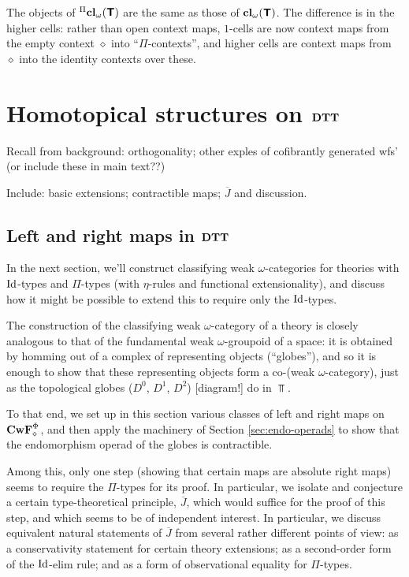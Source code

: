 \documentclass{amsart}
\newcommand{\Jbar}{\overline{J}}
\newcommand{\stuff}{{\Phi}}
\begin{document}
The objects of ${}^\Pi \mathbf{cl}_\omega (\textbf{\textsf{T}})$ are the same as those of $\mathbf{cl}_\omega(\textbf{\textsf{T}})$.  The difference is in the higher cells: rather than open context maps, $1$-cells are now context maps from the empty context $\diamond$ into ``$\Pi$-contexts'', and higher cells are context maps from $\diamond$ into the identity contexts over these.














\section{Homotopical structures on $\mathbf{DTT}$}

Recall from background: orthogonality; other exples of cofibrantly generated wfs' (or include these in main text??)

Include: basic extensions; contractible maps; $\Jbar$ and discussion.

\subsection{Left and right maps in $\mathbf{DTT}$}

\para In the next section, we'll construct classifying weak $\omega$-categories for theories with $\mathrm{Id}$-types and $\Pi$-types (with $\eta$-rules and functional extensionality), and discuss how it might be possible to extend this to require only the $\mathrm{Id}$-types.

The construction of the classifying weak $\omega$-category of a theory is closely analogous to that of the fundamental weak $\omega$-groupoid of a space: it is obtained by homming out of a complex of representing objects (``globes''), and so it is enough to show that these representing objects form a co-(weak $\omega$-category), just as the topological globes ($D^0$, $D^1$, $D^2$) [diagram!] do in $\Top$.

To that end, we set up in this section various classes of left and right maps on $\CwF^{\stuff}_\diamond$, and
then apply the machinery of Section \ref{sec:endo-operads} to show that the endomorphism operad of the globes is contractible.

Among this, only one step (showing that certain maps are absolute right maps) seems to require the $\Pi$-types for its proof.  In particular, we isolate and conjecture a certain type-theoretical principle, $\Jbar$, which would suffice for the proof of this step, and which seems to be of independent interest.  In particular, we discuss equivalent natural statements of $\Jbar$ from several rather different points of view: as a conservativity statement for certain theory extensions; as a second-order form of the $\mathrm{Id}$-elim rule; and as a form of observational equality for $\Pi$-types. 
\end{document}
